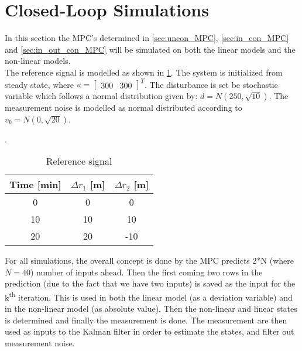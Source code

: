 \section{Closed-Loop Simulations}
In this section the MPC's determined in \cref{sec:uncon_MPC}, \ref{sec:in_con_MPC} and \ref{sec:in_out_con_MPC} will be simulated on both the linear models and the non-linear models.\\
The reference signal is modelled as shown in \cref{tab:CL_sim_ref}. The system is initialized from steady state, where $u=\begin{bmatrix} 300 & 300\end{bmatrix}^T$. The disturbance is set be stochastic variable which follows a normal distribution given by: $d=N(250,\sqrt{10})$. The measurement noise is modelled as normal distributed according to $v_k=N(0,\sqrt{20})$.
\begin{table}[H]. 
    \centering
    \begin{tabular}{|ccc|} \hline
         Time [min] & $\Delta r_1$ [m] & $\Delta r_2$ [m] \\ \hline
         0 & 0 & 0\\
         10 & 10 & 10\\
         20 & 20 & -10 \\\hline
    \end{tabular}
    \caption{Reference signal}
    \label{tab:CL_sim_ref}
\end{table}
For all simulations, the overall concept is done by the MPC predicts 2*N (where $N=40$) number of inputs ahead. Then the first coming two rows in the prediction (due to the fact that we have two inputs) is saved as the input for the k\textsuperscript{th} iteration. This is used in both the linear model (as a deviation variable) and in the non-linear model (as absolute value). Then the non-linear and linear states is determined and finally the measurement is done. The measurement are then used as inputs to the Kalman filter in order to estimate the states, and filter out measurement noise. 


